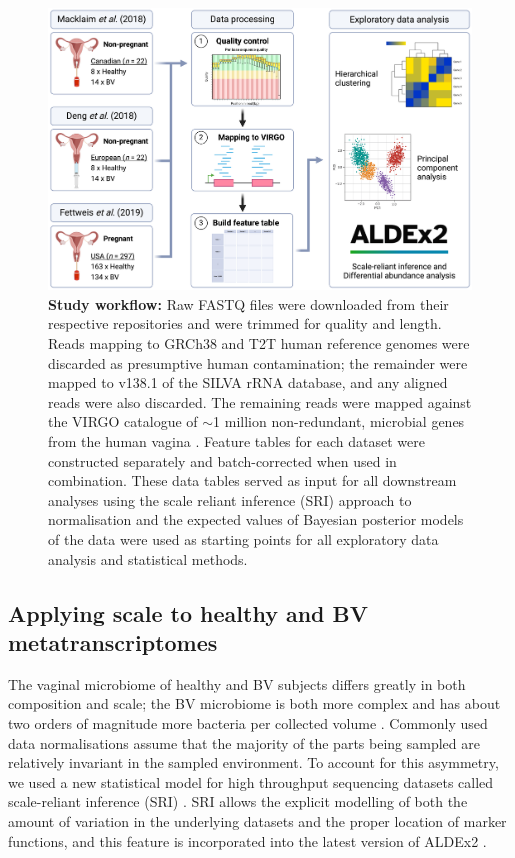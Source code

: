 \documentclass[sn-mathphys,Numbered]{sn-jnl}%
\begin{document}
\begin{figure}[H]%
    \centering
    \includegraphics[scale=0.4]{0_fig1.png}
    \caption{\textbf{Study workflow:} Raw FASTQ files were downloaded from their respective repositories and were trimmed for quality and length. Reads mapping to GRCh38 and T2T human reference genomes were discarded as presumptive human contamination; the remainder were mapped to v138.1 of the SILVA rRNA database, and any aligned reads were also discarded. The remaining reads were mapped against the VIRGO catalogue of $\sim$1 million non-redundant, microbial genes from the human vagina \cite{Ma:2020aa}. Feature tables for each dataset were constructed separately and batch-corrected \cite{Zhang:2020ab} when used in combination. These data tables served as input for all downstream analyses using the scale reliant inference (SRI) approach to normalisation \cite{nixon2023scale} and the expected values of Bayesian posterior models of the data were used as starting points for all exploratory data analysis and statistical methods.} \label{fig:figWorkflow}
\end{figure}

\subsection{Applying scale to healthy and BV metatranscriptomes} 
The vaginal microbiome of healthy and BV subjects differs greatly in both composition and scale; the BV microbiome is both more complex and has about two orders of magnitude more bacteria per collected volume \citep{Zozaya:2010}. Commonly used data normalisations assume that the majority of the parts being sampled are relatively invariant in the sampled environment. To account for this asymmetry, we used a new statistical model for high throughput sequencing datasets called scale-reliant inference (SRI) \citep{nixon2023scale}. SRI allows the explicit modelling of both the amount of variation in the underlying datasets and the proper location of marker functions, and this feature is incorporated into the latest version of ALDEx2 \citep{fernandes:2014, gloorScale}. 
\end{document}
